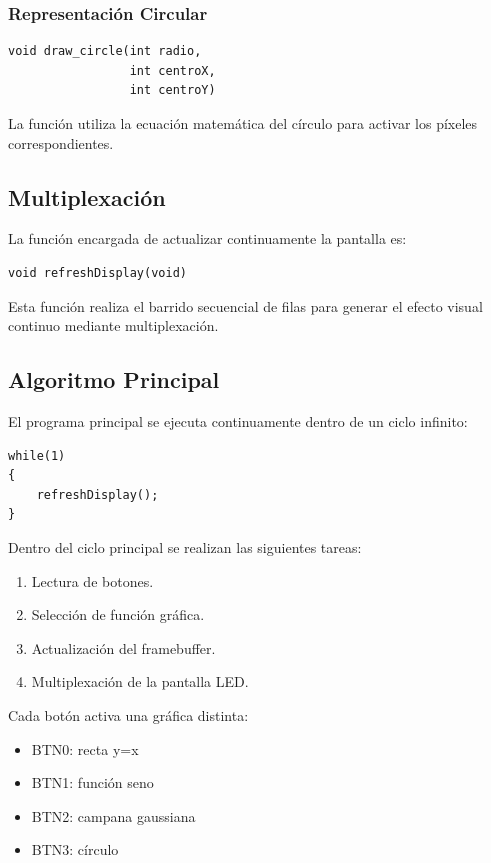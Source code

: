 \subsubsection{Representación Circular}

\begin{verbatim}
void draw_circle(int radio,
                 int centroX,
                 int centroY)
\end{verbatim}

La función utiliza la ecuación matemática del círculo para activar los píxeles correspondientes.

\subsection{Multiplexación}

La función encargada de actualizar continuamente la pantalla es:

\begin{verbatim}
void refreshDisplay(void)
\end{verbatim}

Esta función realiza el barrido secuencial de filas para generar el efecto visual continuo mediante multiplexación.

\subsection{Algoritmo Principal}

El programa principal se ejecuta continuamente dentro de un ciclo infinito:

\begin{verbatim}
while(1)
{
    refreshDisplay();
}
\end{verbatim}

Dentro del ciclo principal se realizan las siguientes tareas:

\begin{enumerate}
    \item Lectura de botones.
    \item Selección de función gráfica.
    \item Actualización del framebuffer.
    \item Multiplexación de la pantalla LED.
\end{enumerate}

Cada botón activa una gráfica distinta:

\begin{itemize}
    \item BTN0: recta y=x
    \item BTN1: función seno
    \item BTN2: campana gaussiana
    \item BTN3: círculo
\end{itemize}

